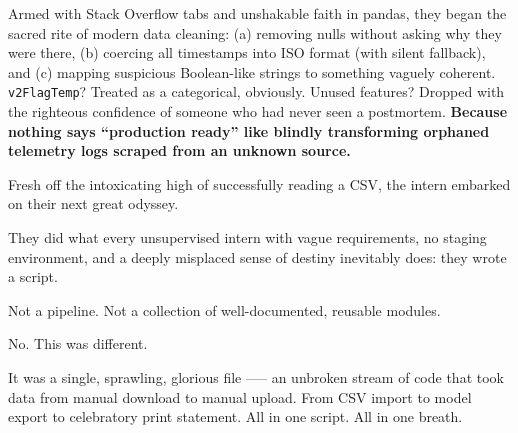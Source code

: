 Armed with Stack Overflow tabs and unshakable faith in pandas, they began the sacred rite of modern data cleaning: (a) removing nulls without asking why they were there, (b) coercing all timestamps into ISO format (with silent fallback), and (c) mapping suspicious Boolean-like strings to something vaguely coherent. \texttt{v2FlagTemp}? Treated as a categorical, obviously. Unused features? Dropped with the righteous confidence of someone who had never seen a postmortem. \textbf{Because nothing says “production ready” like blindly transforming orphaned telemetry logs scraped from an unknown source.}

Fresh off the intoxicating high of successfully reading a CSV, the intern embarked on their next great odyssey.

They did what every unsupervised intern with vague requirements, no staging environment, and a deeply misplaced sense of destiny inevitably does: they wrote a script.

Not a pipeline. Not a collection of well-documented, reusable modules.

No. This was different.

It was a single, sprawling, glorious file --— an unbroken stream of code that took data from manual download to manual upload. From CSV import to model export to celebratory print statement. All in one script. All in one breath.



